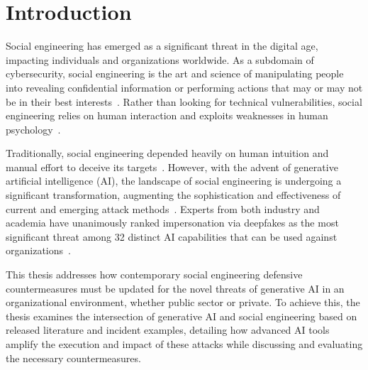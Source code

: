 \chapter{Introduction\label{chapter:intro}}
\begin{comment}
\end{comment}


%
%
Social engineering has emerged as a significant threat in the digital age, impacting individuals and organizations worldwide. As a subdomain of cybersecurity, social engineering is the art and science of manipulating people into revealing confidential information or performing actions that may or may not be in their best interests~\citep{hadnagy_Social_Engineering_The_Science_2018}. Rather than looking for technical vulnerabilities, social engineering relies on human interaction and exploits weaknesses in human psychology~\citep{wang_Defining_Social_Engineering_2020}.





%
%
Traditionally, social engineering depended heavily on human intuition and manual effort to deceive its targets~\citep{mitnick_The_Art_of_Deception_2003, mirsky_Threat_Offensive_AI_Organizations_2023}. However, with the advent of generative artificial intelligence (AI), the landscape of social engineering is undergoing a significant transformation, augmenting the sophistication and effectiveness of current and emerging attack methods~\citep{fakhouri_AI_Driven_Solutions_SE_Attacks_2024}. Experts from both industry and academia have unanimously ranked impersonation via deepfakes as the most significant threat among 32 distinct AI capabilities that can be used against organizations~\citep{mirsky_Threat_Offensive_AI_Organizations_2023}.






%
%
This thesis addresses how contemporary social engineering defensive countermeasures must be updated for the novel threats of generative AI in an organizational environment, whether public sector or private. To achieve this, the thesis examines the intersection of generative AI and social engineering based on released literature and incident examples, detailing how advanced AI tools amplify the execution and impact of these attacks while discussing and evaluating the necessary countermeasures.





